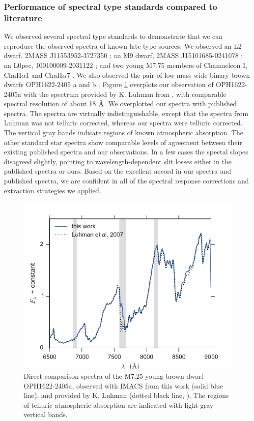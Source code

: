 \subsubsection{Performance of spectral type standards compared to literature}
We observed several spectral type standards to demonstrate that we can reproduce the observed spectra of known late type sources.  We observed an L2 dwarf, 2MASS J11553952-3727350 \citep{2008AJ....136.1290R}; an M9 dwarf, 2MASS J15101685-0241078 \citep{2008AJ....136.1290R}; an L0pec, J00100009-2031122 \citep{2007AJ....133..439C}; and two young M7.75 members of Chamaeleon I, ChaH$\alpha$1 and ChaH$\alpha$7 \citep{2004ApJ...602..816L}.  We also observed the pair of low-mass wide binary brown dwarfs OPH1622-2405 a and b \citep{2006PhDT.........2A,2007ApJ...659.1629L}.  Figure \ref{fig_oph1622_compare} overplots our observation of OPH1622-2405a with the spectrum provided by K. Luhman from \citet{2007ApJ...659.1629L}, with comparable spectral resolution of about 18 $\mbox{\normalfont\AA}$.  We overplotted our spectra with published spectra.  The spectra are virtually indistinguishable, except that the spectra from Luhman was not telluric corrected, whereas our spectra were telluric corrected.  The vertical gray bands indicate regions of known atmospheric absorption.  The other standard star spectra show comparable levels of agreement between their existing published spectra and our observations.  In a few cases the spectal slopes disagreed slightly, pointing to wavelength-dependent slit losses either in the published spectra or ours.  Based on the excellent accord in our spectra and published spectra, we are confident in all of the spectral response corrections and extraction strategies we applied.  

\begin{figure}[ht!]
\caption{ Direct comparison spectra of the M7.25 young brown dwarf OPH1622-2405a, observed with IMACS from this work (solid blue line), and provided by K. Luhman (dotted black line, \citet{2007ApJ...659.1629L}).  The regions of telluric atmospheric absorption are indicated with light gray vertical bands.  \label{fig_oph1622_compare}}
\centering
\includegraphics[scale=0.9]{chIMACS/figures/oph1622-2405a_compare}
\end{figure}

